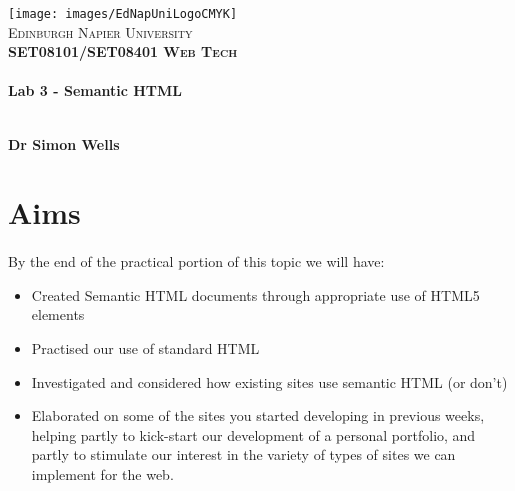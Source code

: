 \documentclass[10pt, a4paper, twosize]{article}
\begin{document}

\begin{titlepage}
\vspace*{5cm}
\begin{center}
\texttt{[image: images/EdNapUniLogoCMYK]}~\\[1cm]

\textsc{\Large Edinburgh Napier University}\\[1.5cm]

\textsc{\LARGE \bfseries SET08101/SET08401 Web Tech}\\[0.5cm]

\hrulefill \\[0.4cm]
{\huge \bfseries Lab 3 - Semantic HTML \\[0.4cm] }
\hrulefill \\[1.5cm]

\begin{minipage}{0.4\textwidth}
\begin{flushleft} \large
\textbf{Dr Simon Wells} \\
\end{flushleft}
\end{minipage}

\vfill

\end{center}
\end{titlepage}




%

\section{Aims}
\paragraph{} By the end of the practical portion of this topic we will have:

\begin{itemize}
\item Created Semantic HTML documents through appropriate use of HTML5 elements
\item Practised our use of standard HTML
\item Investigated and considered how existing sites use semantic HTML (or don't)
\item Elaborated on some of the sites you started developing in previous weeks, helping partly to kick-start our development of a personal portfolio, and partly to stimulate our interest in the variety of types of sites we can implement for the web.
\end{itemize}
\end{document}
